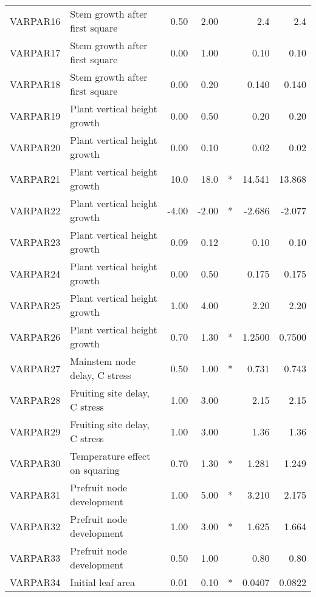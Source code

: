 \begin{longtable}{llrrcrr}
    VARPAR16  & Stem growth after first square   & 0.50   & 2.00   &     & 2.4      & 2.4      \\
    VARPAR17  & Stem growth after first square   & 0.00   & 1.00   &     & 0.10     & 0.10     \\
    VARPAR18  & Stem growth after first square   & 0.00   & 0.20   &     & 0.140    & 0.140    \\
    VARPAR19  & Plant vertical height growth     & 0.00   & 0.50   &     & 0.20     & 0.20     \\
    VARPAR20  & Plant vertical height growth     & 0.00   & 0.10   &     & 0.02     & 0.02     \\
    VARPAR21  & Plant vertical height growth     & 10.0   & 18.0   & *   & 14.541   & 13.868   \\
    VARPAR22  & Plant vertical height growth     & -4.00  & -2.00  & *   & -2.686   & -2.077   \\
    VARPAR23  & Plant vertical height growth     & 0.09   & 0.12   &     & 0.10     & 0.10     \\
    VARPAR24  & Plant vertical height growth     & 0.00   & 0.50   &     & 0.175    & 0.175    \\
    VARPAR25  & Plant vertical height growth     & 1.00   & 4.00   &     & 2.20     & 2.20     \\
    VARPAR26  & Plant vertical height growth     & 0.70   & 1.30   & *   & 1.2500   & 0.7500   \\
    VARPAR27  & Mainstem node delay, C stress    & 0.50   & 1.00   & *   & 0.731    & 0.743    \\
    VARPAR28  & Fruiting site delay, C stress    & 1.00   & 3.00   &     & 2.15     & 2.15     \\
    VARPAR29  & Fruiting site delay, C stress    & 1.00   & 3.00   &     & 1.36     & 1.36     \\
    VARPAR30  & Temperature effect on squaring   & 0.70   & 1.30   & *   & 1.281    & 1.249    \\
    VARPAR31  & Prefruit node development        & 1.00   & 5.00   & *   & 3.210    & 2.175    \\
    VARPAR32  & Prefruit node development        & 1.00   & 3.00   & *   & 1.625    & 1.664    \\
    VARPAR33  & Prefruit node development        & 0.50   & 1.00   &     & 0.80     & 0.80     \\
    VARPAR34  & Initial leaf area                & 0.01   & 0.10   & *   & 0.0407   & 0.0822   \\

\end{longtable}
